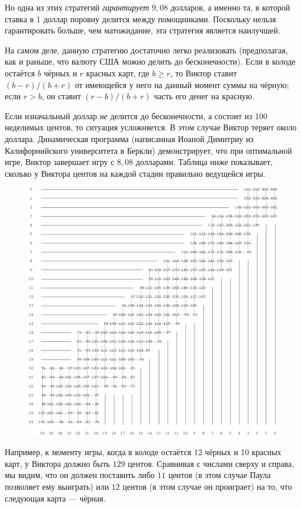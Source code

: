 Но одна из этих стратегий \emph{гарантирует} $9{,}08$ долларов, а именно та, в которой ставка в 1 доллар поровну делится между помощниками.
Поскольку нельзя гарантировать больше, чем матожидание, эта стратегия является наилучшей.\heart

На самом деле, данную стратегию достаточно легко реализовать (предполагая, как и раньше, что валюту США можно делить до бесконечности).
Если в колоде остаётся $b$ чёрных и $r$ красных карт, где $b\ge r$, то Виктор ставит $(b - r)/(b + r)$ от имеющейся у него на данный момент суммы на чёрную; если $r > b$, он ставит $(r - b)/(b + r)$ часть его денег на красную.

\medskip

Если изначальный доллар \emph{не} делится до бесконечности, а состоит из 100 неделимых центов, то ситуация усложняется.
В этом случае Виктор теряет около доллара.
Динамическая программа (написанная Иоаной Димитриу %
из Калифорнийского университета в Беркли) демонстрирует, что при оптимальной игре, Виктор завершает игру с $8{,}08$ долларами.
Таблица ниже показывает, сколько у Виктора центов на каждой стадии правильно ведущейся игры.
\begin{figure}[h!]
\centering
\includegraphics[scale=0.64]{Figs/Games/ioana}
\end{figure}
Например, к моменту игры, когда в колоде остаётся 12 чёрных и 10 красных карт, у Виктора должно быть $129$ центов. 
Сравнивая с числами сверху и справа, мы видим, что он должен поставить либо $11$ центов (в этом случае Паула позволяет ему выиграть) или $12$ центов (в этом случае он проиграет) на то, что следующая карта --- чёрная.

